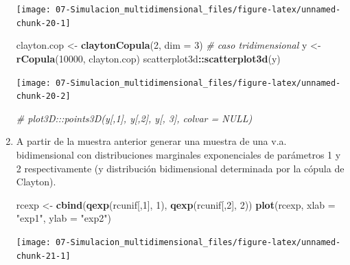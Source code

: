 \documentclass[
]{book}
\newenvironment{Shaded}{\begin{snugshade}}{\end{snugshade}}
\newcommand{\CommentTok}[1]{\textcolor[rgb]{0.56,0.35,0.01}{\textit{#1}}}
\newcommand{\DataTypeTok}[1]{\textcolor[rgb]{0.13,0.29,0.53}{#1}}
\newcommand{\DecValTok}[1]{\textcolor[rgb]{0.00,0.00,0.81}{#1}}
\newcommand{\KeywordTok}[1]{\textcolor[rgb]{0.13,0.29,0.53}{\textbf{#1}}}
\newcommand{\NormalTok}[1]{#1}
\newcommand{\OperatorTok}[1]{\textcolor[rgb]{0.81,0.36,0.00}{\textbf{#1}}}
\newcommand{\StringTok}[1]{\textcolor[rgb]{0.31,0.60,0.02}{#1}}
\theoremstyle{break}
\theoremstyle{definition}
\theoremstyle{definition}
\theoremstyle{definition}
\theoremstyle{remark}
\begin{document}
\begin{enumerate}
  \begin{center}\texttt{[image: 07-Simulacion\_multidimensional\_files/figure-latex/unnamed-chunk-20-1]} \end{center}

\begin{Shaded}
\begin{Highlighting}[]
\NormalTok{clayton.cop <-}\StringTok{ }\KeywordTok{claytonCopula}\NormalTok{(}\DecValTok{2}\NormalTok{, }\DataTypeTok{dim =} \DecValTok{3}\NormalTok{) }\CommentTok{# caso tridimensional}
\NormalTok{y <-}\StringTok{ }\KeywordTok{rCopula}\NormalTok{(}\DecValTok{10000}\NormalTok{, clayton.cop)}
\NormalTok{scatterplot3d}\OperatorTok{::}\KeywordTok{scatterplot3d}\NormalTok{(y)}
\end{Highlighting}
\end{Shaded}

  \begin{center}\texttt{[image: 07-Simulacion\_multidimensional\_files/figure-latex/unnamed-chunk-20-2]} \end{center}

\begin{Shaded}
\begin{Highlighting}[]
\CommentTok{# plot3D:::points3D(y[,1], y[,2], y[, 3], colvar = NULL) }
\end{Highlighting}
\end{Shaded}
\item
  A partir de la muestra anterior generar una muestra de una v.a.
  bidimensional con distribuciones marginales exponenciales de
  parámetros 1 y 2 respectivamente (y distribución bidimensional
  determinada por la cópula de Clayton).

\begin{Shaded}
\begin{Highlighting}[]
\NormalTok{rcexp <-}\StringTok{ }\KeywordTok{cbind}\NormalTok{(}\KeywordTok{qexp}\NormalTok{(rcunif[,}\DecValTok{1}\NormalTok{], }\DecValTok{1}\NormalTok{), }\KeywordTok{qexp}\NormalTok{(rcunif[,}\DecValTok{2}\NormalTok{], }\DecValTok{2}\NormalTok{))}
\KeywordTok{plot}\NormalTok{(rcexp, }\DataTypeTok{xlab =} \StringTok{"exp1"}\NormalTok{, }\DataTypeTok{ylab =} \StringTok{"exp2"}\NormalTok{)}
\end{Highlighting}
\end{Shaded}

  \begin{center}\texttt{[image: 07-Simulacion\_multidimensional\_files/figure-latex/unnamed-chunk-21-1]} \end{center}


\end{enumerate}
\end{document}
